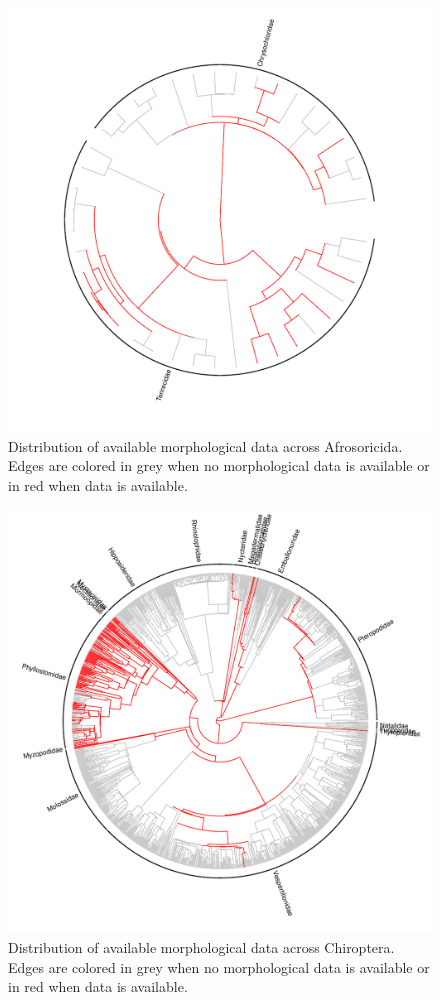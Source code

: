 \begin{figure}[!htbp]
\centering
    \includegraphics[width=1\textwidth]{Supplementary/Supp_figure_AFROSORICIDA.pdf}
\caption{Distribution of available morphological data across Afrosoricida. Edges are colored in grey when no morphological data is available or in red when data is available.}
\label{Supp_Figure_Phylo-Afrosoricida}
\end{figure}

\begin{figure}[!htbp]
\centering
    \includegraphics[width=1\textwidth]{Supplementary/Supp_figure_CHIROPTERA.pdf}
\caption{Distribution of available morphological data across Chiroptera. Edges are colored in grey when no morphological data is available or in red when data is available.}
\label{Supp_Figure_Phylo-Chiroptera}
\end{figure}

